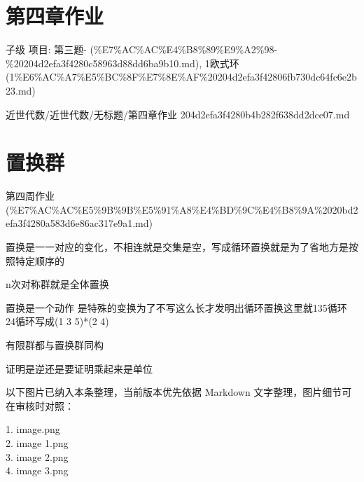 \section*{第四章作业}

\begin{homework}

子级 项目: 第三题- (\%E7\%AC\%AC\%E4\%B8\%89\%E9\%A2\%98-\%20204d2efa3f4280c58963d88dd6ba9b10.md), 1欧式环 (1\%E6\%AC\%A7\%E5\%BC\%8F\%E7\%8E\%AF\%20204d2efa3f42806fb730dc64fc6e2b23.md)

\end{homework}

\begin{note}[来源路径]

近世代数/近世代数/无标题/第四章作业 204d2efa3f4280b4b282f638dd2dce07.md

\end{note}

\section*{置换群}

\begin{note}[来源上级主题]

第四周作业 (\%E7\%AC\%AC\%E5\%9B\%9B\%E5\%91\%A8\%E4\%BD\%9C\%E4\%B8\%9A\%2020bd2efa3f4280a583d6e86ac317e9a1.md)

\end{note}

\begin{homework}

置换是一一对应的变化，不相连就是交集是空，写成循环置换就是为了省地方是按照特定顺序的

n次对称群就是全体置换

置换是一个动作 是特殊的变换为了不写这么长才发明出循环置换这里就135循环 24循环写成(1 3 5)*(2 4)

有限群都与置换群同构

证明是逆还是要证明乘起来是单位

\end{homework}

\begin{note}[关联图片]
以下图片已纳入本条整理，当前版本优先依据 Markdown 文字整理，图片细节可在审核时对照：

1. image.png\\
2. image 1.png\\
3. image 2.png\\
4. image 3.png\\

\end{note}


